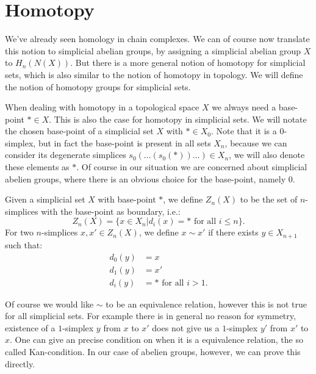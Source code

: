 \section{Homotopy}
\label{sec:Homotopy}

We've already seen homology in chain complexes. We can of course now translate this notion to simplicial abelian groups, by assigning a simplicial abelian group $X$ to $H_n(N(X))$. But there is a more general notion of homotopy for simplicial sets, which is also similar to the notion of homotopy in topology. We will define the notion of homotopy groups for simplicial sets.

When dealing with homotopy in a topological space $X$ we always need a base-point $\ast \in X$. This is also the case for homotopy in simplicial sets. We will notate the chosen base-point of a simplicial set $X$ with $\ast \in X_0$. Note that it is a $0$-simplex, but in fact the base-point is present in all sets $X_n$, because we can consider its degenerate simplices $s_0(\ldots(s_0(\ast))\ldots) \in X_n$, we will also denote these elements as $\ast$. Of course in our situation we are concerned about simplicial abelien groups, where there is an obvious choice for the base-point, namely $0$.


\begin{definition}
	Given a simplicial set $X$ with base-point $\ast$, we define $Z_n(X)$ to be the set of $n$-simplices with the base-point as boundary, i.e.:
	$$ Z_n(X) = \{ x \in X_n | d_i(x) = \ast \text{ for all } i \leq n \}. $$
	For two $n$-simplices $x, x' \in Z_n(X)$, we define $x \sim x'$ if there exists $y \in X_{n+1}$ such that:
	\begin{align}
		d_0(y) &= x \\
		d_1(y) &= x' \\
		d_i(y) &= \ast \text{ for all } i > 1.
	\end{align}
\end{definition}

Of course we would like $\sim$ to be an equivalence relation, however this is not true for all simplicial sets. For example there is in general no reason for symmetry, existence of a $1$-simplex $y$ from $x$ to $x'$ does not give us a $1$-simplex $y'$ from $x'$ to $x$. One can give an precise condition on when it is a equivalence relation, the so called Kan-condition. In our case of abelien groups, however, we can prove this directly.

